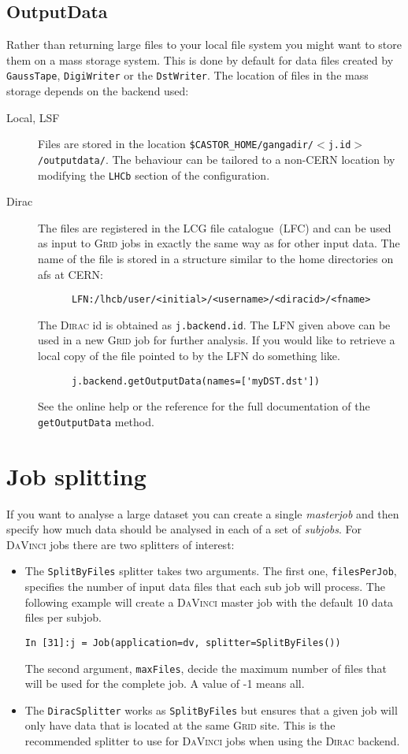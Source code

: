 \documentclass{howto}
\def\davinci {\textsc{DaVinci}\xspace}
\def\dirac {\textsc{Dirac}\xspace}
\def\grid {\textsc{Grid}\xspace}
\begin{document}
\subsection{OutputData}
\label{sec:OutputData}
Rather than returning large files to your local file system you might want to
store them on a mass storage system. This is done by default for data files
created by \texttt{GaussTape}, \texttt{DigiWriter} or the
\texttt{DstWriter}. The location of files in the mass storage depends on the
backend used:
\begin{description}
\item[Local, LSF] Files are stored in the location
  \texttt{\$CASTOR_HOME/gangadir/$<$j.id$>$/outputdata/}. The behaviour can be
  tailored to a non-CERN location by modifying the \texttt{LHCb} section of
  the configuration.
\item[Dirac] The files are registered in the LCG file catalogue~(LFC) and can
  be used as input to \grid jobs in exactly the same way as for other input
  data. The name of the file is stored in a structure similar to the home
  directories on afs at CERN:
\begin{verbatim}
      LFN:/lhcb/user/<initial>/<username>/<diracid>/<fname> 
\end{verbatim}
  The \dirac id is obtained as \texttt{j.backend.id}. The LFN given above can
  be used in a new \grid job for further analysis. If you would like to
  retrieve a local copy of the file pointed to by the LFN do something like.
\begin{verbatim}
      j.backend.getOutputData(names=['myDST.dst'])
\end{verbatim}
  See the online help or the reference for the full documentation of the
  \texttt{getOutputData} method.
\end{description}

\section{Job splitting}
\label{sec:splitting}
If you want to analyse a large dataset you can create a single
\emph{masterjob} and then specify how much data should be analysed in each of
a set of \emph{subjobs}. For \davinci jobs there are two splitters of interest:
\begin{itemize}
\item The \texttt{SplitByFiles} splitter takes two arguments. The first one,
  \texttt{filesPerJob}, specifies the number of input data files that each sub
  job will process. The following example will create a \davinci master job
  with the default 10 data files per subjob.
\begin{verbatim}
In [31]:j = Job(application=dv, splitter=SplitByFiles())
\end{verbatim}
  The second argument, \texttt{maxFiles}, decide the maximum number of files
  that will be used for the complete job. A value of -1 means all.
\item The \texttt{DiracSplitter} works as \texttt{SplitByFiles} but ensures
  that a given job will only have data that is located at the same \grid
  site. This is the recommended splitter to use for \davinci jobs when using
  the \dirac backend.
\end{itemize}
\end{document}
